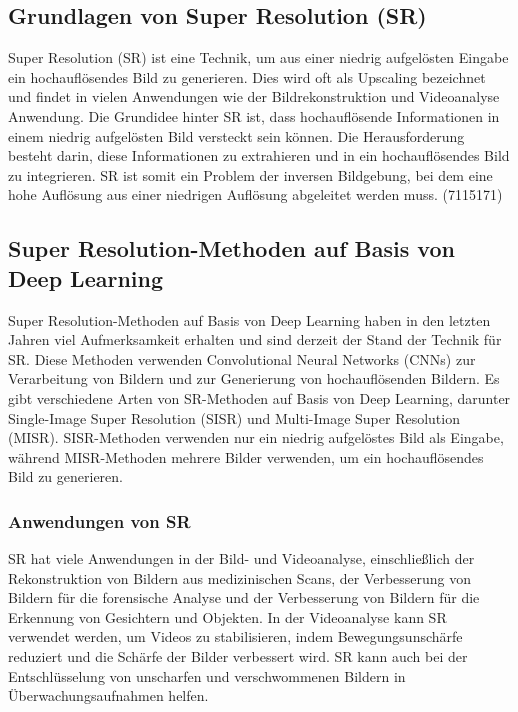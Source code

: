     \subsection{Grundlagen von Super Resolution (SR)}
    
        Super Resolution (SR) ist eine Technik, um aus einer niedrig aufgelösten Eingabe ein hochauflösendes Bild zu generieren. 
        Dies wird oft als Upscaling bezeichnet und findet in vielen Anwendungen wie der Bildrekonstruktion und Videoanalyse Anwendung.
        Die Grundidee hinter SR ist, dass hochauflösende Informationen in einem niedrig aufgelösten Bild versteckt sein können. 
        Die Herausforderung besteht darin, diese Informationen zu extrahieren und in ein hochauflösendes Bild zu integrieren. 
        SR ist somit ein Problem der inversen Bildgebung, bei dem eine hohe Auflösung aus einer niedrigen Auflösung abgeleitet werden muss.
        \footfullcite(7115171)
    \subsection{Super Resolution-Methoden auf Basis von Deep Learning}
    
        Super Resolution-Methoden auf Basis von Deep Learning haben in den letzten Jahren viel Aufmerksamkeit erhalten und sind derzeit der Stand der Technik für SR. 
        Diese Methoden verwenden Convolutional Neural Networks (CNNs) zur Verarbeitung von Bildern und zur Generierung von hochauflösenden Bildern.
        Es gibt verschiedene Arten von SR-Methoden auf Basis von Deep Learning, darunter Single-Image Super Resolution (SISR) und Multi-Image Super Resolution (MISR). 
        SISR-Methoden verwenden nur ein niedrig aufgelöstes Bild als Eingabe, während MISR-Methoden mehrere Bilder verwenden, um ein hochauflösendes Bild zu generieren.
    
    \subsubsection{Anwendungen von SR}
    
        SR hat viele Anwendungen in der Bild- und Videoanalyse, einschließlich der Rekonstruktion von Bildern aus medizinischen Scans, der Verbesserung von Bildern für die forensische Analyse und der Verbesserung von Bildern für die Erkennung von Gesichtern und Objekten.
        In der Videoanalyse kann SR verwendet werden, um Videos zu stabilisieren, indem Bewegungsunschärfe reduziert und die Schärfe der Bilder verbessert wird. 
        SR kann auch bei der Entschlüsselung von unscharfen und verschwommenen Bildern in Überwachungsaufnahmen helfen.
    
